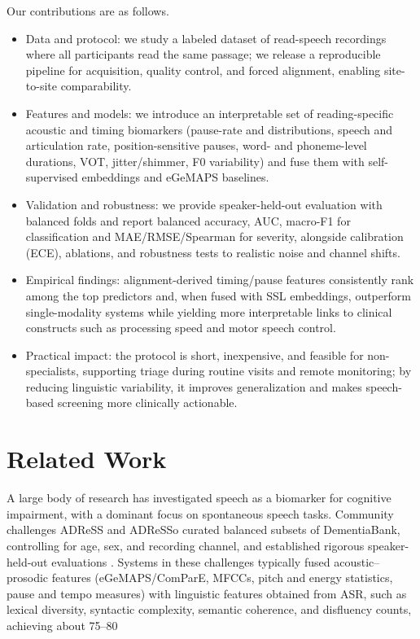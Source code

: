 \documentclass{article}
\begin{document}
Our contributions are as follows.
\begin{itemize}
\item Data and protocol: we study a labeled dataset of read-speech recordings where all participants read the same passage; we release a reproducible pipeline for acquisition, quality control, and forced alignment, enabling site-to-site comparability.
\item Features and models: we introduce an interpretable set of reading-specific acoustic and timing biomarkers (pause-rate and distributions, speech and articulation rate, position-sensitive pauses, word- and phoneme-level durations, VOT, jitter/shimmer, F0 variability) and fuse them with self-supervised embeddings and eGeMAPS baselines.
\item Validation and robustness: we provide speaker-held-out evaluation with balanced folds and report balanced accuracy, AUC, macro-F1 for classification and MAE/RMSE/Spearman for severity, alongside calibration (ECE), ablations, and robustness tests to realistic noise and channel shifts.
\item Empirical findings: alignment-derived timing/pause features consistently rank among the top predictors and, when fused with SSL embeddings, outperform single-modality systems while yielding more interpretable links to clinical constructs such as processing speed and motor speech control.
\item Practical impact: the protocol is short, inexpensive, and feasible for non-specialists, supporting triage during routine visits and remote monitoring; by reducing linguistic variability, it improves generalization and makes speech-based screening more clinically actionable.
\end{itemize}

\section{Related Work}
A large body of research has investigated speech as a biomarker for cognitive impairment, with a dominant focus on spontaneous speech tasks. Community challenges ADReSS and ADReSSo curated balanced subsets of DementiaBank, controlling for age, sex, and recording channel, and established rigorous speaker-held-out evaluations \citep{adress2020,adresso2021}. Systems in these challenges typically fused acoustic–prosodic features (eGeMAPS/ComParE, MFCCs, pitch and energy statistics, pause and tempo measures) with linguistic features obtained from ASR, such as lexical diversity, syntactic complexity, semantic coherence, and disfluency counts, achieving about 75–80%
\end{document}
